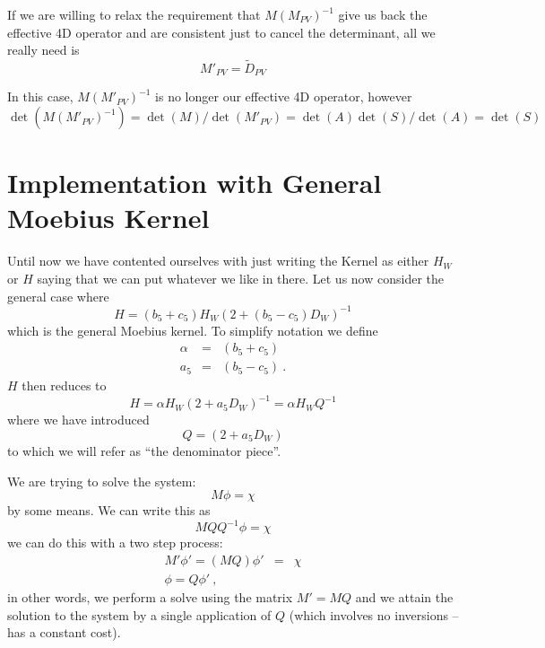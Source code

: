\documentclass[12pt]{article}
\begin{document}
If we are willing to relax the requirement that $M ( M_{PV})^{-1}$ give
us back the effective 4D operator and are consistent just to cancel 
the determinant, all we really need is
\begin{equation}
M'_{PV} = \tilde{D}_{PV}
\end{equation}

In this case,  $M ( M'_{PV})^{-1}$ is no longer our effective 4D operator,
however
\begin{equation}
\det\left( M ( M'_{PV})^{-1} \right) = \det(M) / \det(M'_{PV}) = \det(A)\det(S)/\det(A) = \det(S)
\end{equation}

\section{Implementation with General Moebius Kernel}
Until now we have contented ourselves with just writing the Kernel as either
$H_W$ or $H$ saying that we can put whatever we like in there. Let us now
consider the general case where 
\begin{equation}
H = (b_5 + c_5) H_W ( 2 + (b_5 - c_5)D_W )^{-1}
\end{equation}
which is the general Moebius kernel. To simplify notation we define
\begin{eqnarray}
\alpha &=& (b_5 + c_5) \\
a_5      &=& (b_5 -c_5) \ .
\end{eqnarray}
$H$ then reduces to
\begin{equation}
H = \alpha H_W ( 2 + a_5 D_W )^{-1} = \alpha H_W Q^{-1}
\end{equation}
where we have introduced 
\begin{equation}
Q = ( 2 + a_5 D_W )
\end{equation}
to which we will refer as ``the denominator piece''.

We are trying to solve the system:
\begin{equation}
M \phi = \chi
\end{equation}
by some means. We can write this as
\begin{equation}
M Q Q^{-1} \phi = \chi
\end{equation}
we can do this with a two step process:
\begin{eqnarray}
M'\phi' = (M Q) \phi' &=& \chi \\
\phi = Q \phi' \ , 
\end{eqnarray}
in other words, we perform a solve using the matrix $M'=MQ$
and we attain the solution to the system by a single application
of $Q$ (which involves no inversions -- has a constant cost).
\end{document}
